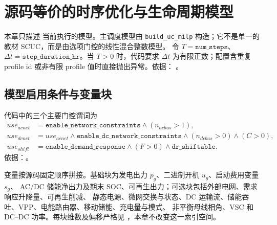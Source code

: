 \section{源码等价的时序优化与生命周期模型}
\label{sec:time-series-source-equivalent}

本章只描述  当前执行的模型。主调度模型由
\texttt{build\_uc\_milp} 构造；它不是单一的教材 SCUC，而是由选项门控的线性混合整数模型。
令 $T=\texttt{num\_steps}$、$\Delta t=\texttt{step\_duration\_hr}$。当 $T>0$ 时，代码要求
$\Delta t$ 为有限正数；配置含重复 profile id 或非有限 profile 值时直接抛出异常。依据：
。

\subsection{模型启用条件与变量块}
代码中的三个主要门控谓词为
\begin{align}
 use_{acnet}&=\texttt{enable\_network\_constraints}\land(n_{acbus}>1),\\
 use_{dcnet}&=use_{acnet}\land\texttt{enable\_dc\_network\_constraints}
 \land(n_{dcbus}>0)\land(C>0),\\
 use_{shift}&=\texttt{enable\_demand\_response}\land(F>0)\land
 \texttt{dr\_shiftable}.
\end{align}
依据：。

变量按源码固定顺序拼接。基础块为发电出力 $p_g$、二进制开机 $u_g$、启动费用变量 $s_g$、
AC/DC 储能净出力及期末 SOC、可再生出力；可选块包括外部电网、需求响应升降量、可再生削减、
静态电源、微网交换与状态、DC 运输流、储能吞吐、VPP、电能路由器、移动储能、充电量与模式、
非平衡母线相角、VSC 和 DC--DC 功率。每块维数及偏移严格见
，本章不改变这一索引空间。

